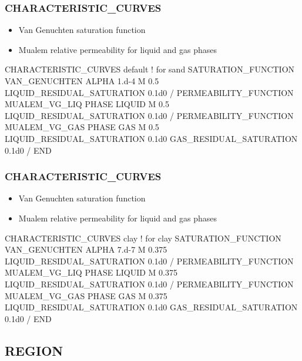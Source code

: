 \documentclass{beamer}
\newcommand\redcomment[1]{{{\color{red} #1}}}
\newcommand\bluecomment[1]{{{\color{blue} #1}}}
\begin{document}
\begin{frame}\frametitle{CHARACTERISTIC\_CURVES}

\begin{itemize}\small
  \item Van Genuchten \redcomment{saturation function}
  \item Mualem \redcomment{relative permeability} for liquid and gas phases
\end{itemize}

\begin{semiverbatim}\small
CHARACTERISTIC_CURVES default \bluecomment{! for sand}
  SATURATION_FUNCTION VAN_GENUCHTEN
    ALPHA 1.d-4
    M 0.5
    LIQUID_RESIDUAL_SATURATION 0.1d0
  /
  PERMEABILITY_FUNCTION MUALEM_VG_LIQ
    PHASE LIQUID
    M 0.5
    LIQUID_RESIDUAL_SATURATION 0.1d0
  /
  PERMEABILITY_FUNCTION MUALEM_VG_GAS
    PHASE GAS
    M 0.5
    LIQUID_RESIDUAL_SATURATION 0.1d0
    GAS_RESIDUAL_SATURATION 0.1d0
  /
END
\end{semiverbatim}

\end{frame}

\begin{frame}\frametitle{CHARACTERISTIC\_CURVES}

\begin{itemize}\small
  \item Van Genuchten \redcomment{saturation function}
  \item Mualem \redcomment{relative permeability} for liquid and gas phases
\end{itemize}

\begin{semiverbatim}\small
CHARACTERISTIC_CURVES clay \bluecomment{! for clay}
  SATURATION_FUNCTION VAN_GENUCHTEN
    ALPHA 7.d-7
    M 0.375
    LIQUID_RESIDUAL_SATURATION 0.1d0
  /
  PERMEABILITY_FUNCTION MUALEM_VG_LIQ
    PHASE LIQUID
    M 0.375
    LIQUID_RESIDUAL_SATURATION 0.1d0
  /
  PERMEABILITY_FUNCTION MUALEM_VG_GAS
    PHASE GAS
    M 0.375
    LIQUID_RESIDUAL_SATURATION 0.1d0
    GAS_RESIDUAL_SATURATION 0.1d0
  /
END
\end{semiverbatim}

\end{frame}
\subsection{REGION}
\end{document}
